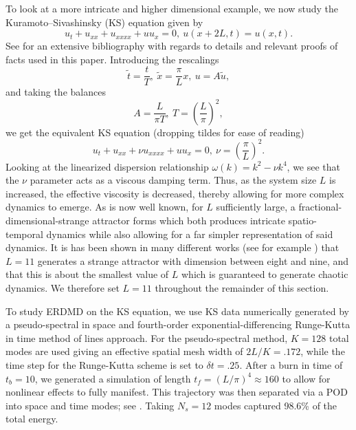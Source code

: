 \documentclass[a4paper,11pt]{article}
\begin{document}
To look at a more intricate and higher dimensional example, we now study the Kuramoto--Sivashinsky (KS) equation given by 
\[
u_{t} + u_{xx} + u_{xxxx} + uu_{x} = 0, ~ u(x+2L,t) = u(x,t).
\]
See \cite{robinson} for an extensive bibliography with regards to details and relevant proofs of facts used in this paper.  Introducing the rescalings
\[
\tilde{t} =\frac{t}{T}, ~ \tilde{x} = \frac{\pi}{L}x, ~ u = A\tilde{u},
\]
and taking the balances
\[
A = \frac{L}{\pi T}, ~ T = \left(\frac{L}{\pi}\right)^{2}, 
\]
we get the equivalent KS equation (dropping tildes for ease of reading)
\[
u_{t} + u_{xx} + \nu u_{xxxx} + uu_{x} = 0, ~ \nu = \left(\frac{\pi}{L}\right)^{2}.
\]
Looking at the linearized dispersion relationship $\omega(k) = k^{2} - \nu k^{4}$, we see that the $\nu$ parameter acts as a viscous damping term.  Thus, as the system size $L$ is increased, the effective viscosity is decreased, thereby allowing for more complex dynamics to emerge.  As is now well known, for $L$ sufficiently large, a fractional-dimensional-strange attractor forms which both produces intricate spatio-temporal dynamics while also allowing for a far simpler representation of said dynamics.  It is has been shown in many different works (see for example \cite{citanovic}) that $L=11$ generates a strange attractor with dimension between eight and nine, and that this is about the smallest value of $L$ which is guaranteed to generate chaotic dynamics.  We therefore set $L=11$ throughout the remainder of this section.  

To study ERDMD on the KS equation, we use KS data numerically generated by a pseudo-spectral in space and fourth-order exponential-differencing Runge-Kutta in time method \cite{kassam} of lines approach.  For the pseudo-spectral method, $K=128$ total modes are used giving an effective spatial mesh width of $2L/K = .172$, while the time step for the Runge-Kutta scheme is set to $\delta t = .25$.  After a burn in time of $t_{b}=10$, we generated a simulation of length $t_{f} = \left(L/\pi\right)^{4}\approx 160$ to allow for nonlinear effects to fully manifest.  This trajectory was then separated via a POD into space and time modes; see \cite{berkooz}.  Taking $N_{s}=12$ modes captured 98.6\% of the total energy.  
\end{document}
